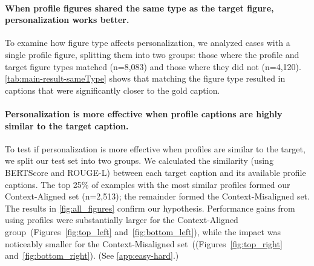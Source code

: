 



\paragraph{When profile figures shared the same type as the target figure, personalization works better.}
To examine how figure type affects personalization, we analyzed cases with a single profile figure, splitting them into two groups: those where the profile and target figure types matched (n=8,083) and those where they did not (n=4,120). \autoref{tab:main-result-sameType} shows that matching the figure type resulted in captions that were significantly closer to the gold caption.



\paragraph{Personalization is more effective when profile captions are highly similar to the target caption.}\label{para:context-alignment}

To test if personalization is more effective when profiles are similar to the target, we split our test set into two groups. We calculated the similarity (using BERTScore and ROUGE-L) between each target caption and its available profile captions. The top 25\% of examples with the most similar profiles formed our Context-Aligned set (n=2,513); the remainder formed the Context-Misaligned set. The results in \autoref{fig:all_figures} confirm our hypothesis. Performance gains from using profiles were substantially larger for the Context-Aligned group~(Figures~\ref{fig:top_left} and~\ref{fig:bottom_left}), while the impact was noticeably smaller for the Context-Misaligned set~((Figures~\ref{fig:top_right} and~\ref{fig:bottom_right}). 
(See \autoref{app:easy-hard}.)




